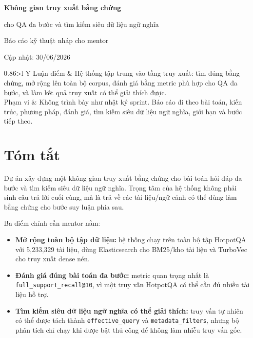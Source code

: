 \documentclass[11pt,a4paper]{article}
\newcommand{\metric}[1]{\texttt{#1}}
\newcommand{\claim}[1]{\textbf{\color{vdtnavy}#1}}
\begin{document}
\begin{titlepage}
  \centering
  \vspace*{1.0cm}
  {\Huge\sffamily\bfseries Không gian truy xuất bằng chứng\par}
  \vspace{0.4cm}
  {\Large\sffamily cho QA đa bước và tìm kiếm siêu dữ liệu ngữ nghĩa\par}
  \vspace{1.2cm}
  {\large Báo cáo kỹ thuật nháp cho mentor\par}
  \vspace{0.4cm}
  {\large Cập nhật: 30/06/2026\par}
  \vfill
  \begin{tabularx}{0.86\textwidth}{>{\bfseries\sffamily}l Y}
    Luận điểm &
    Hệ thống tập trung vào tầng truy xuất: tìm đúng bằng chứng, mở rộng lên toàn bộ corpus,
    đánh giá bằng metric phù hợp cho QA đa bước, và làm kết quả truy xuất có thể giải thích được. \\
    Phạm vi &
    Không trình bày như nhật ký sprint. Báo cáo đi theo bài toán, kiến trúc, phương pháp,
    đánh giá, tìm kiếm siêu dữ liệu ngữ nghĩa, giới hạn và bước tiếp theo. \\
  \end{tabularx}
\end{titlepage}

\tableofcontents
\newpage

\section{Tóm tắt}

Dự án xây dựng một không gian truy xuất bằng chứng cho bài toán hỏi đáp đa bước
và tìm kiếm siêu dữ liệu ngữ nghĩa. Trọng tâm của hệ thống không phải sinh câu trả lời cuối cùng,
mà là trả về các tài liệu/ngữ cảnh có thể dùng làm bằng chứng cho bước suy luận phía sau.

Ba điểm chính cần mentor nắm:

\begin{itemize}
  \item \claim{Mở rộng toàn bộ tập dữ liệu:} hệ thống chạy trên toàn bộ tập HotpotQA với
  5,233,329 tài liệu, dùng Elasticsearch cho BM25/kho tài liệu và TurboVec cho truy xuất dense nén.
  \item \claim{Đánh giá đúng bài toán đa bước:} metric quan trọng nhất là
  \metric{full\_support\_recall@10}, vì một truy vấn HotpotQA có thể cần đủ nhiều tài liệu hỗ trợ.
  \item \claim{Tìm kiếm siêu dữ liệu ngữ nghĩa có thể giải thích:} truy vấn tự nhiên có thể được tách thành
  \texttt{effective\_query} và \texttt{metadata\_filters}, nhưng bộ phân tích chỉ chạy khi được bật thủ công để không làm nhiễu truy vấn gốc.
\end{itemize}
\end{document}
